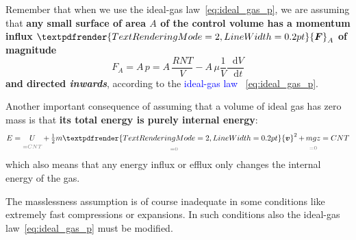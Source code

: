 \documentclass[a4paper,12pt,%
onecolumn,oneside,%
british%
]{memoir}
\renewcommand*{\bm}[1]{\textpdfrender{TextRenderingMode=2,LineWidth=0.2pt}{\boldsymbol{#1}}}
\newcommand*{\di}{\mathop{}\!\mathrm{d}}%
\renewcommand*{\|}[1][]{\nonscript\:#1\vert\nonscript\:\mathopen{}}
\newcommand*{\sect}{\S}%
\renewcommand*{\autoref}[3][\sect\,\ref]{\textcolor{blue}{#3}
\raisebox{0.6ex}{\color{blue}\miniscule%
\faIcon{angle-right}%
\;#1{#2}\;p.\,\pageref{#2}}}
\newcommand*{\yvis}{\mu} %
\newcommand*{\yv}{\bm{v}}
\newcommand*{\dt}{\di t}
\newcommand*{\yN}{N}
\newcommand*{\ym}{m}%
\newcommand*{\yE}{E}
\newcommand*{\yU}{U}
\newcommand*{\yF}{\bm{F}}
\newcommand*{\ypr}{p} %
\newcommand*{\yT}{T}%
\begin{document}
Remember that when we use the ideal-gas law~\eqref{eq:ideal_gas_p}, we are assuming that \textbf{any small surface of area $A$ of the control volume has a momentum influx $\yF_{A}$ of magnitude}
\begin{equation*}
  F_{A} = A\,\ypr = A\,\frac{R \yN \yT}{V} - A\,\yvis \frac{1}{V}\frac{\di V}{\dt}
\end{equation*}
\textbf{and directed \emph{inwards}}, according to the \autoref{def:idealgas_law}{ideal-gas law}~\eqref{eq:ideal_gas_p}.

\medskip

Another important consequence of assuming that a volume of ideal gas has zero mass is that \textbf{its total energy is purely internal energy}:
\begin{equation*}
  \yE =
 \underbracket[0pt]{\yU}_{\mathcolor{midgrey}{{}=C N \yT}}
  + \underbracket[0pt]{\tfrac12\ym\yv^{2}}_{\mathcolor{midgrey}{{}=0}}
  + \underbracket[0pt]{\ym g z}_{\mathcolor{midgrey}{{}=0}}
  = C N \yT
\end{equation*}
which also means that any energy influx or efflux only changes the internal energy of the gas.

The masslessness assumption is of course inadequate in some conditions like extremely fast compressions or expansions. In such conditions also the ideal-gas law~\eqref{eq:ideal_gas_p} must be modified.

\end{document}
